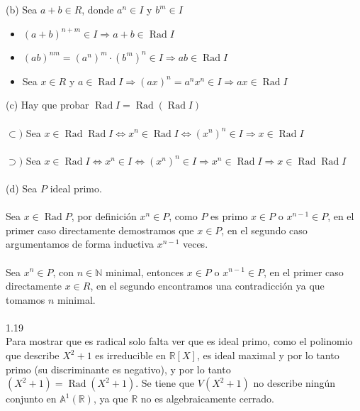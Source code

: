 \documentclass{article}
\newcommand{\R}{\mathbb{R}}
\newcommand{\A}{\mathbb{A}}
\begin{document}
\\
\\
(b) Sea $a+b \in R$, donde $a^n \in I$ y $b^m \in I$
\begin{itemize}
    \item $(a+b)^{n+m} \in I \Longrightarrow a+b \in \operatorname{Rad}{I}$
    \item $(ab)^{nm}=(a^{n})^m \cdot (b^{m})^{n} \in I \Longrightarrow ab \in \operatorname{Rad}{I}$
    \item Sea $x \in R$ y $a \in \operatorname{Rad}{I} \Longrightarrow (ax)^{n}=a^n x^n \in I \Longrightarrow ax \in \operatorname{Rad}{I}$
\end{itemize}
(c) Hay que probar $\operatorname{Rad}{I}=\operatorname{Rad}{(\operatorname{Rad}{I})}$
\\
\\
$\subset)$ Sea $x \in \operatorname{Rad}{\operatorname{Rad}{I}} \Longleftrightarrow x^n \in \operatorname{Rad}{I} \Longleftrightarrow (x^n)^n \in I \Longrightarrow x \in \operatorname{Rad}{I}$
\\
\\
$\supset)$ Sea $x \in \operatorname{Rad}{I} \Longleftrightarrow x^n \in I \Longleftrightarrow (x^n)^n \in I \Longrightarrow x^n \in \operatorname{Rad}{I} \Longrightarrow x \in \operatorname{Rad}{\operatorname{Rad}{I}}$
\\
\\
(d) Sea $P$ ideal primo.
\\
\\
Sea $x \in \operatorname{Rad}{P}$, por definición $x^n \in P$, como $P$ es primo $x \in P$ o $x^{n-1} \in P$, en el primer caso directamente demostramos que $x \in P$, en el segundo caso argumentamos de forma inductiva $x^{n-1}$ veces.
\\
\\
Sea $x^n \in P$, con $n \in \mathbb{N}$ minimal, entonces $x \in P$ o $x^{n-1} \in P$, en el primer caso directamente $x \in R$, en el segundo encontramos una contradicción ya que tomamos $n$ minimal.
\\
\\
1.19
\\
Para mostrar que es radical solo falta ver que es ideal primo, como el polinomio que describe $X^2 +1$ es irreducible en $\R[X]$, es ideal maximal y por lo tanto primo (su discriminante es negativo), y por lo tanto $(X^2 +1)=\operatorname{Rad}{(X^2+1)}$. Se tiene que $V(X^2+1)$ no describe ningún conjunto en $\A^{1}(\mathbb{R})$, ya que $\R$ no es algebraicamente cerrado.
\\
\end{document}
